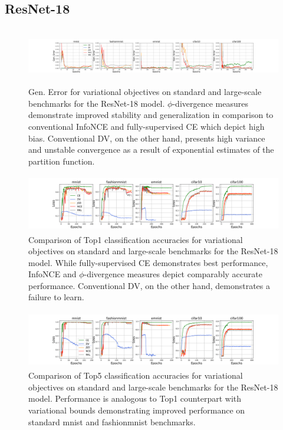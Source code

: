 \documentclass{article}
\begin{document}
\subsection{ResNet-18}
\begin{figure}[H]
  \centering
    \includegraphics[height=2.5cm,width=14cm]{18_gen_error.png}
    \caption{Gen. Error for variational objectives on standard and large-scale benchmarks for the ResNet-18 model. $\phi$-divergence measures demonstrate improved stability and generalization in comparison to conventional InfoNCE and fully-supervised CE which depict high bias. Conventional DV, on the other hand, presents high variance and unstable convergence as a result of exponential estimates of the partition function.}
  \end{figure}
  \begin{figure}[H]
    \centering
      \includegraphics[height=2.5cm,width=14cm]{18_top1_acc.png}
      \caption{Comparison of Top1 classification accuracies for variational objectives on standard and large-scale benchmarks for the ResNet-18 model. While fully-supervised CE demonstrates best performance, InfoNCE and $\phi$-divergence measures depict comparably accurate performance. Conventional DV, on the other hand, demonstrates a failure to learn.}
    \end{figure}
    \begin{figure}[H]
      \centering
        \includegraphics[height=2.5cm,width=14cm]{18_top5_acc.png}
        \caption{Comparison of Top5 classification accuracies for variational objectives on standard and large-scale benchmarks for the ResNet-18 model. Performance is analogous to Top1 counterpart with variational bounds demonstrating improved performance on standard mnist and fashionmnist benchmarks.}
      \end{figure}
      
\end{document}
